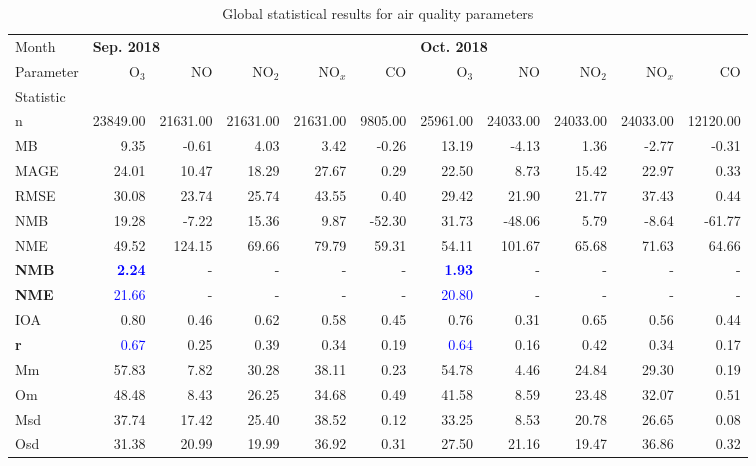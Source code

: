 \begin{table}
\begin{threeparttable}[b]
\footnotesize
\centering
\caption{Global statistical results for air quality parameters}
\label{tab: gl_st}
\begin{tabular}{lrrrrrrrrrr}
\toprule
{Month} & \multicolumn{5}{l}{\bf Sep. 2018} & \multicolumn{5}{l}{\bf Oct. 2018} \\
{Parameter} &    O$_3$ &        NO &    NO$_2$ &    NO$_x$ &       CO &   O$_3$ &        NO &    NO$_2$ &    NO$_x$ &        CO \\
Statistic\tnote{(a)} \\
\midrule
n    &  23849.00 &  21631.00 &  21631.00 &  21631.00 &  9805.00 &  25961.00 &  24033.00 &  24033.00 &  24033.00 &  12120.00 \\
MB   &      9.35 &     -0.61 &      4.03 &      3.42 &    -0.26 &     13.19 &     -4.13 &      1.36 &     -2.77 &     -0.31 \\
MAGE &     24.01 &     10.47 &     18.29 &     27.67 &     0.29 &     22.50 &      8.73 &     15.42 &     22.97 &      0.33 \\
RMSE &     30.08 &     23.74 &     25.74 &     43.55 &     0.40 &     29.42 &     21.90 &     21.77 &     37.43 &      0.44 \\
NMB\tnote{(b)}  &     19.28 &     -7.22 &     15.36 &      9.87 &   -52.30 &     31.73 &    -48.06 &      5.79 &     -8.64 &    -61.77 \\
NME\tnote{(b)}  &     49.52 &    124.15 &     69.66 &     79.79 &    59.31 &     54.11 &    101.67 &     65.68 &     71.63 &     64.66 \\
\bf{NMB}\tnote{(c)}  &  \textcolor{blue}{\bf 2.24} &    - &     - &     - &   - &      \textcolor{blue}{\bf 1.93} & - &  - &     - &   - \\
\bf{NME}\tnote{(c)}  &     \textcolor{blue}{21.66} &    - &     - &     - &    - &     \textcolor{blue}{20.80} &    - &     - &   - &  - \\
IOA  &      0.80 &      0.46 &      0.62 &      0.58 &     0.45 &      0.76 &      0.31 &      0.65 &      0.56 &      0.44 \\
\textbf{r }   &      \textcolor{blue}{0.67} &      0.25 &      0.39 &      0.34 &     0.19 &      \textcolor{blue}{0.64} &      0.16 &      0.42 &      0.34 &      0.17 \\
Mm   &     57.83 &      7.82 &     30.28 &     38.11 &     0.23 &     54.78 &      4.46 &     24.84 &     29.30 &      0.19 \\
Om   &     48.48 &      8.43 &     26.25 &     34.68 &     0.49 &     41.58 &      8.59 &     23.48 &     32.07 &      0.51 \\
Msd  &     37.74 &     17.42 &     25.40 &     38.52 &     0.12 &     33.25 &      8.53 &     20.78 &     26.65 &      0.08 \\
Osd  &     31.38 &     20.99 &     19.99 &     36.92 &     0.31 &     27.50 &     21.16 &     19.47 &     36.86 &      0.32 \\


\end{tabular}
\end{threeparttable}
\end{table}
